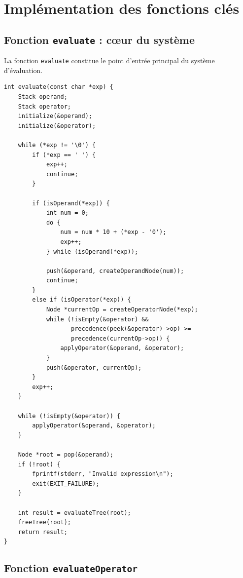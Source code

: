 \documentclass[12pt,a4paper]{article}
\begin{document}
\section{Implémentation des fonctions clés}

\subsection{Fonction \texttt{evaluate} : cœur du système}

La fonction \texttt{evaluate} constitue le point d'entrée principal du système d'évaluation.

\begin{lstlisting}[caption={Fonction evaluate complète}]
int evaluate(const char *exp) {
    Stack operand;
    Stack operator;
    initialize(&operand);
    initialize(&operator);

    while (*exp != '\0') {
        if (*exp == ' ') {
            exp++;
            continue;
        }

        if (isOperand(*exp)) {
            int num = 0;
            do {
                num = num * 10 + (*exp - '0');
                exp++;
            } while (isOperand(*exp));

            push(&operand, createOperandNode(num));
            continue;
        }
        else if (isOperator(*exp)) {
            Node *currentOp = createOperatorNode(*exp);
            while (!isEmpty(&operator) &&
                   precedence(peek(&operator)->op) >=
                   precedence(currentOp->op)) {
                applyOperator(&operand, &operator);
            }
            push(&operator, currentOp);
        }
        exp++;
    }

    while (!isEmpty(&operator)) {
        applyOperator(&operand, &operator);
    }

    Node *root = pop(&operand);
    if (!root) {
        fprintf(stderr, "Invalid expression\n");
        exit(EXIT_FAILURE);
    }

    int result = evaluateTree(root);
    freeTree(root);
    return result;
}
\end{lstlisting}

\subsection{Fonction \texttt{evaluateOperator}}
\end{document}
